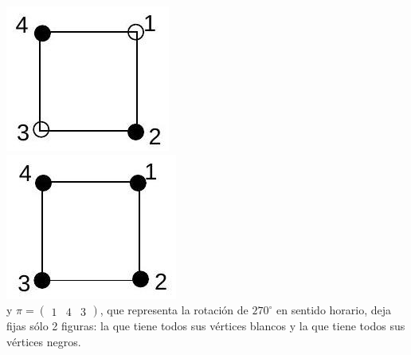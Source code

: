 \documentclass[10pt]{article}
\begin{document}
\includegraphics[max width=\textwidth, center]{2025_09_05_3ba26226ec0baddb5a03g-53(1)}\\
\includegraphics[max width=\textwidth, center]{2025_09_05_3ba26226ec0baddb5a03g-53(3)}\\
y $\pi=\left(\begin{array}{lll}1 & 4 & 3\end{array}\right)$, que representa la rotación de $270^{\circ}$ en sentido horario, deja fijas sólo 2 figuras: la que tiene todos sus vértices blancos y la que tiene todos sus vértices negros.\\
\end{document}
